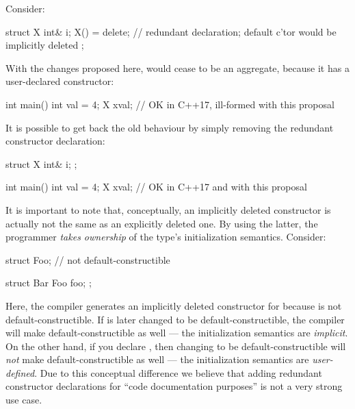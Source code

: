 Consider:

\begin{minipage}{\textwidth}
\begin{codeblock}
struct X {
  int& i;
  X() = delete;  // redundant declaration; default c'tor would be implicitly deleted
};
\end{codeblock}
\end{minipage}

With the changes proposed here,  would cease to be an aggregate, because it has a user-declared constructor:

\begin{minipage}{\textwidth}
\begin{codeblock}
int main() {
  int val = 4;
  X x{val};  // OK in C++17, ill-formed with this proposal
}
\end{codeblock}
\end{minipage}

It is possible to get back the old behaviour by simply removing the redundant constructor declaration:

\begin{codeblock}
struct X {
  int& i;
};

int main() {
  int val = 4;
  X x{val};  // OK in C++17 and with this proposal
}
\end{codeblock}

It is important to note that, conceptually, an implicitly deleted constructor is actually not the same as an explicitly deleted one. By using the latter, the programmer \emph{takes ownership} of the type's initialization semantics. Consider:

\begin{codeblock}
struct Foo; // not default-constructible

struct Bar {
  Foo foo;
};
\end{codeblock}

Here, the compiler generates an implicitly deleted constructor for  because  is not default-constructible. If  is later changed to be default-constructible, the compiler will make  default-constructible as well --- the initialization semantics are \emph{implicit}. On the other hand, if you declare , then changing  to be default-constructible will \emph{not} make  default-constructible as well --- the initialization semantics are \emph{user-defined}. Due to this conceptual difference we believe that adding redundant constructor declarations for ``code documentation purposes'' is not a very strong use case.

